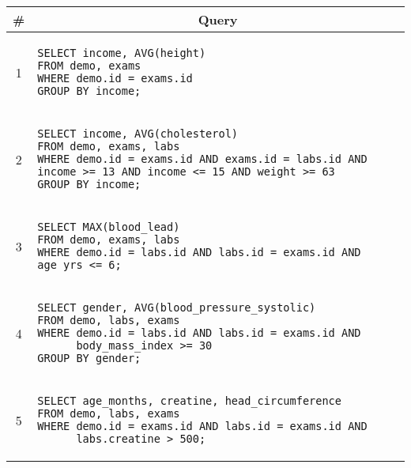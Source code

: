 \begin{tabular}{cl}
\toprule
\# & \multicolumn{1}{c}{Query} \\
\midrule
1 & 
\begin{minipage}{6in}
\begin{lstlisting}[breaklines]
SELECT income, AVG(height)
FROM demo, exams
WHERE demo.id = exams.id
GROUP BY income;
\end{lstlisting}
\end{minipage}{queryno} \label{q1} \\
2 & 
\begin{minipage}{6in}
\begin{lstlisting}[breaklines]
SELECT income, AVG(cholesterol)
FROM demo, exams, labs
WHERE demo.id = exams.id AND exams.id = labs.id AND
income >= 13 AND income <= 15 AND weight >= 63
GROUP BY income;
\end{lstlisting}
\end{minipage}
{queryno} \label{q2} \\
3 & 
\begin{minipage}{6in}
\begin{lstlisting}[breaklines]
SELECT MAX(blood_lead)
FROM demo, exams, labs
WHERE demo.id = labs.id AND labs.id = exams.id AND age_yrs <= 6;
\end{lstlisting}
\end{minipage}{queryno} \label{q3}\\
4 & 
\begin{minipage}{6in}
\begin{lstlisting}[breaklines]
SELECT gender, AVG(blood_pressure_systolic)
FROM demo, labs, exams
WHERE demo.id = labs.id AND labs.id = exams.id AND
      body_mass_index >= 30
GROUP BY gender;
\end{lstlisting}
\end{minipage}{queryno} \label{q4}\\
5 & 
\begin{minipage}{6in}
\begin{lstlisting}[breaklines]
SELECT age_months, creatine, head_circumference
FROM demo, labs, exams
WHERE demo.id = exams.id AND labs.id = exams.id AND
      labs.creatine > 500;
\end{lstlisting}
\end{minipage}{queryno} \label{q5}\\
\bottomrule
\end{tabular}
